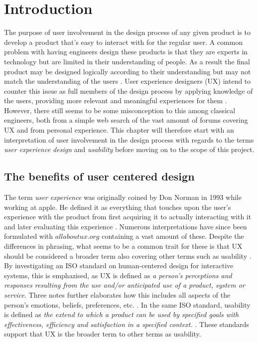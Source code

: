\chapter{Introduction}
\label{Introduction}
The purpose of user involvement in the design process of any given product is to develop a product that's easy to interact with for the regular user. A common problem with having engineers design these products is that they are experts in technology but are limited in their understanding of people. As a result the final product may be designed logically according to their understanding but may not match the understanding of the users \parencite[][6]{PDF:DonNorman}. User experience designers (UX) intend to counter this issue as full members of the design process by applying knowledge of the users, providing more relevant and meaningful experiences for them \parencite{WEB:UXDesign}. However, there still seems to be some misconception to this among classical engineers, both from a simple web search of the vast amount of forums covering UX and from personal experience. This chapter will therefore start with an interpretation of user involvement in the design process with regards to the terms \textit{user experience design} and \textit{usability} before moving on to the scope of this project.

\section{The benefits of user centered design}
\label{UXbenefits}
The term \textit{user experience} was originally coined by Don Norman in 1993 while working at apple. He defined it as everything that touches upon the user's experience with the product from first acquiring it to actually interacting with it and later evaluating this experience \parencite{WEB:DonNormanOnUX}. Numerous interpretations have since been formulated with $allaboutux.org$ containing a vast amount of these. Despite the differences in phrasing, what seems to be a common trait for these is that UX should be considered a broader term also covering other terms such as usability \parencite{WEB:UXDefinitions}. By investigating an ISO standard on human-centered design for interactive systems, this is emphazised, as UX is defined as \textit{a person's perceptions and responses resulting from the use and/or anticipated use of a product, system or service}. Three notes further elaborates how this includes all aspects of the person's emotions, beliefs, preferences, etc. \parencite[][3]{WEB:UXISO}. In the same ISO standard, usability is defined as \textit{the extend to which a product can be used by specified goals with effectiveness, efficiency and satisfaction in a specified context.} \parencite{WEB:UXISO}. These standards support that UX is the broader term to other terms as usability.\\

